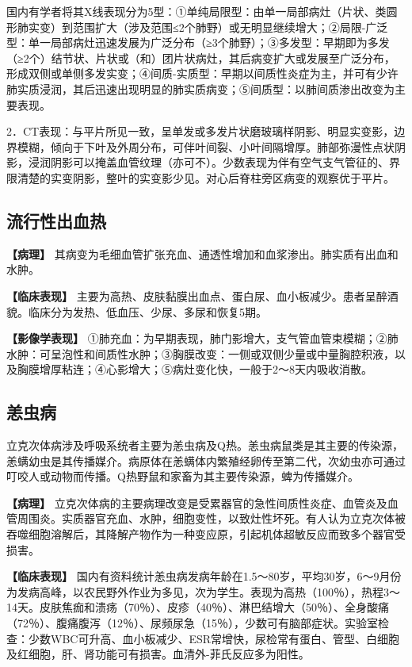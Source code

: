 国内有学者将其X线表现分为5型：①单纯局限型：由单一局部病灶（片状、类圆形肺实变）到范围扩大（涉及范围≤2个肺野）或无明显继续增大；②局限-广泛型：单一局部病灶迅速发展为广泛分布（≥3个肺野）；③多发型：早期即为多发（≥2个）结节状、片状或（和）团片状病灶，其后病变扩大或发展至广泛分布，形成双侧或单侧多发实变；④间质-实质型：早期以间质性炎症为主，并可有少许肺实质浸润，其后迅速出现明显的肺实质病变；⑤间质型：以肺间质渗出改变为主要表现。

2．CT表现：与平片所见一致，呈单发或多发片状磨玻璃样阴影、明显实变影，边界模糊，倾向于下叶及外周分布，可伴叶间裂、小叶间隔增厚。肺部弥漫性点状阴影，浸润阴影可以掩盖血管纹理（亦可不）。少数表现为伴有空气支气管征的、界限清楚的实变阴影，整叶的实变影少见。对心后脊柱旁区病变的观察优于平片。

\subsection{流行性出血热}

\textbf{【病理】}
其病变为毛细血管扩张充血、通透性增加和血浆渗出。肺实质有出血和水肿。

\textbf{【临床表现】}
主要为高热、皮肤黏膜出血点、蛋白尿、血小板减少。患者呈醉酒貌。临床分为发热、低血压、少尿、多尿和恢复5期。

\textbf{【影像学表现】}
①肺充血：为早期表现，肺门影增大，支气管血管束模糊；②肺水肿：可呈泡性和间质性水肿；③胸膜改变：一侧或双侧少量或中量胸腔积液，以及胸膜增厚粘连；④心影增大；⑤病灶变化快，一般于2～8天内吸收消散。

\subsection{恙虫病}

立克次体病涉及呼吸系统者主要为恙虫病及Q热。恙虫病鼠类是其主要的传染源，恙螨幼虫是其传播媒介。病原体在恙螨体内繁殖经卵传至第二代，次幼虫亦可通过叮咬人或动物而传播。Q热野鼠和家畜为其主要传染源，蜱为传播媒介。

\textbf{【病理】}
立克次体病的主要病理改变是受累器官的急性间质性炎症、血管炎及血管周围炎。实质器官充血、水肿，细胞变性，以致灶性坏死。有人认为立克次体被吞噬细胞溶解后，其降解产物作为一种变应原，引起机体超敏反应而致多个器官受损害。

\textbf{【临床表现】}
国内有资料统计恙虫病发病年龄在1.5～80岁，平均30岁，6～9月份为发病高峰，以农民野外作业为多见，次为学生。表现为高热（100％），热程3～14天。皮肤焦痂和溃疡（70％）、皮疹（40％）、淋巴结增大（50％）、全身酸痛（72％）、腹痛腹泻（12％）、尿频尿急（15％），少数可有脑部症状。实验室检查：少数WBC可升高、血小板减少、ESR常增快，尿检常有蛋白、管型、白细胞及红细胞，肝、肾功能可有损害。血清外-菲氏反应多为阳性。

